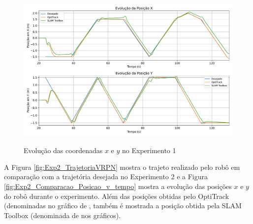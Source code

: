 
\begin{figure}[htb]
    \centering
    \caption{Evolução das coordenadas $x$ e $y$ no Experimento 1}
    \includegraphics[width=\linewidth]{img/Resultados/Exp1_VRPN_Control_LINEAR/Exp1_pose_tempo.pdf}
    \sourceParbox[\linewidth]
    \label{fig:Exp1_XY_vs_tempo}
\end{figure}


%     



A Figura \ref{fig:Exp2_TrajetoriaVRPN} mostra o trajeto realizado pelo robô em comparação com a trajetória desejada no Experimento 2 e a Figura \ref{fig:Exp2_Comparacao_Posicao_v_tempo} mostra a evolução das posições $x$ e $y$ do robô durante o experimento. Além das posições obtidas pelo OptiTrack (denominadas no gráfico de , também é mostrada a posição obtida pela SLAM Toolbox (denominada de  nos gráficos).


